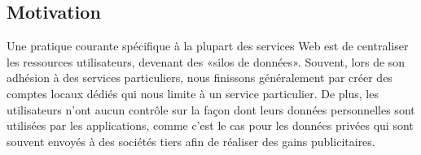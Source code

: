 \subsection*{Motivation}
Une pratique courante spécifique à la plupart des services Web est de centraliser les ressources utilisateurs, devenant des «silos de données». Souvent, lors de son adhésion à des services particuliers, nous finissons généralement par créer des comptes locaux dédiés qui nous limite à un service particulier. De plus, les utilisateurs n'ont aucun contrôle sur la façon dont leurs données personnelles sont utilisées par les applications, comme c'est le cas pour les données privées qui sont souvent envoyés à des sociétés tiers afin de réaliser des gains publicitaires.\\


